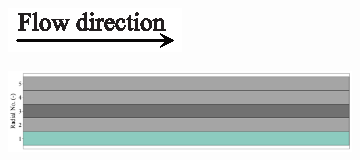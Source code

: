 \documentclass[preprint,12pt]{elsarticle}
\begin{document}
\begin{figure}[h!]
     \centering
     \begin{subfigure}[b]{\textwidth}
     	\includegraphics[width=\textwidth]{flow_dir.eps}
     \end{subfigure}
     \begin{subfigure}[b]{0.85\textwidth}
\includegraphics[width=\textwidth]{results/segments/5seg/80C20T/seg.png}
     \end{subfigure}
     \hfill
     \begin{subfigure}[b]{0.1\textwidth}

\end{subfigure}
\end{figure}
\end{document}
